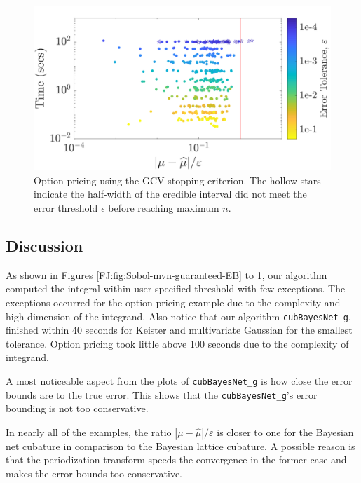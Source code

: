 \documentclass[graybox,footinfo]{svmult}
\newcommand{\abs}[1]{\left\lvert #1 \right\rvert} %
\newcommand{\FJHNote}[1]{{\textcolor{blue}{FJH: #1}}}
\newcommand{\JRNote}[1]{{\textcolor{green}{JR: #1}}}
\begin{document}
\begin{figure}
\centering
\includegraphics[width=0.95\linewidth]{"figures/Sobol/Sobol_optPrice_guaranteed_time_GCV__d12_r1_2019-Sep-1"}
\caption[Sobol: Option pricing guaranteed: GCV]{Option pricing using the GCV stopping criterion. The hollow stars indicate the half-width of the credible interval did not meet the error threshold $\epsilon$ before reaching maximum $n$.}
\label{FJ:fig:Sobol-optprice-guaranteed-GCV}
\end{figure}




\subsection{Discussion}

As shown in Figures \ref{FJ:fig:Sobol-mvn-guaranteed-EB} to \ref{FJ:fig:Sobol-optprice-guaranteed-GCV}, our algorithm computed the integral within user specified threshold with few exceptions. The exceptions occurred for the  option pricing example due to the complexity and high dimension of the integrand. 
Also notice that our algorithm \texttt{cubBayesNet\_g}, finished within 40 seconds for Keister and multivariate Gaussian for the smallest tolerance. Option pricing took little above 100 seconds due to the complexity of integrand.

A most noticeable aspect from the plots of \texttt{cubBayesNet\_g} is how close the error bounds are to the true error. 
This shows that the \texttt{cubBayesNet\_g}'s error bounding is not too conservative.

In nearly all of the examples, the ratio $\abs{\mu - \widehat{\mu}}/\varepsilon$  is closer to one for the Bayesian net cubature in comparison to the Bayesian lattice cubature.  
A possible reason is that the periodization transform speeds the convergence in the former case and makes the error bounds too conservative.
\end{document}
